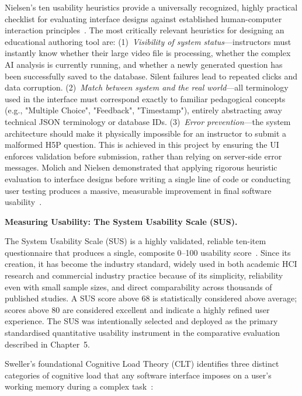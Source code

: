 Nielsen's ten usability heuristics provide a universally recognized, highly practical checklist for evaluating interface designs against established human-computer interaction principles~\cite{nielsen1994}. The most critically relevant heuristics for designing an educational authoring tool are: 
(1)~\emph{Visibility of system status}---instructors must instantly know whether their large video file is processing, whether the complex AI analysis is currently running, and whether a newly generated question has been successfully saved to the database. Silent failures lead to repeated clicks and data corruption.
(2)~\emph{Match between system and the real world}---all terminology used in the interface must correspond exactly to familiar pedagogical concepts (e.g., "Multiple Choice", "Feedback", "Timestamp"), entirely abstracting away technical JSON terminology or database IDs.
(3)~\emph{Error prevention}---the system architecture should make it physically impossible for an instructor to submit a malformed H5P question. This is achieved in this project by ensuring the UI enforces validation before submission, rather than relying on server-side error messages. Molich and Nielsen demonstrated that applying rigorous heuristic evaluation to interface designs before writing a single line of code or conducting user testing produces a massive, measurable improvement in final software usability~\cite{molich1990}.

\textbf{Measuring Usability: The System Usability Scale (SUS).}

The System Usability Scale (SUS) is a highly validated, reliable ten-item questionnaire that produces a single, composite 0--100 usability score~\cite{brooke1996}. Since its creation, it has become the industry standard, widely used in both academic HCI research and commercial industry practice because of its simplicity, reliability even with small sample sizes, and direct comparability across thousands of published studies. A SUS score above 68 is statistically considered above average; scores above 80 are considered excellent and indicate a highly refined user experience. The SUS was intentionally selected and deployed as the primary standardised quantitative usability instrument in the comparative evaluation described in Chapter~5.

Sweller's foundational Cognitive Load Theory (CLT) identifies three distinct categories of cognitive load that any software interface imposes on a user's working memory during a complex task~\cite{sweller1988}:

